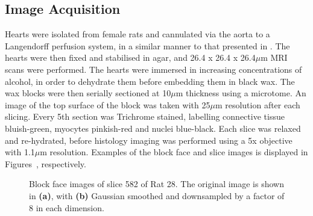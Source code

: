   \subsection{Image Acquisition} %
  \label{sub:image_acquisition}
    Hearts were isolated from female rats and cannulated via the aorta to a Langendorff perfusion system, in a similar manner to that presented in \cite{Burton2006}. The hearts were then fixed and stabilised in agar, and 26.4 x 26.4 x 26.4$\mu$m MRI scans were performed. The hearts were immersed in increasing concentrations of alcohol, in order to dehydrate them before embedding them in black wax. The wax blocks were then serially sectioned at 10$\mu$m thickness using a microtome. An image of the top surface of the block was taken with 25$\mu$m resolution after each slicing. Every 5th section was Trichrome stained, labelling connective tissue bluish-green, myocytes pinkish-red and nuclei blue-black. Each slice was relaxed and re-hydrated, before histology imaging was performed using a 5x objective with 1.1$\mu$m resolution. Examples of the block face and slice images is displayed in Figures~, respectively.
		
		\begin{figure}[htbp]
		  \centering
		  \caption{Block face images of slice 582 of Rat 28. The original image is shown in \textbf{(a)}, with \textbf{(b)} Gaussian smoothed and downsampled by a factor of 8 in each dimension.}
		  \label{fig:original_lores_images}
		\end{figure}
    
